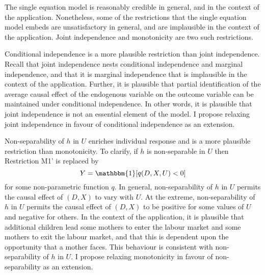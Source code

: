 \documentclass[12pt,a4paper,twoside]{article}
\numberwithin{equation}{section}
\begin{document}
The single equation model is reasonably credible in general, and in the context of the application. Nonetheless, some of the restrictions that the single equation model embeds are unsatisfactory in general, and are implausible in the context of the application. Joint independence and monotonicity are two such restrictions. 

Conditional independence is a more plausible restriction than joint independence. Recall that joint independence nests conditional independence and marginal independence, and that it is marginal independence that is implausible in the context of the application. Further, it is plausible that partial identification of the average causal effect of the endogenous variable on the outcome variable can be maintained under conditional independence. In other words, it is plausible that joint independence is not an essential element of the model. I propose relaxing joint independence in favour of conditional independence as an extension.

Non-separability of $h$ in $U$ enriches individual response and is a more plausible restriction than monotonicity. To clarify, if $h$ is non-separable in $U$ then Restriction M1' is replaced by  
\[Y=\mathbbm{1}[q(D,X,U)<0]\]
for some non-parametric function $q$. In general, non-separability of $h$ in $U$ permits the causal effect of $(D,X)$ to vary with $U$. At the extreme, non-separability of $h$ in $U$ permits the causal effect of $(D,X)$ to be positive for some values of $U$ and negative for others. In the context of the application, it is plausible that additional children lead some mothers to enter the labour market and some mothers to exit the labour market, and that this is dependent upon the opportunity that a mother faces. This behaviour is consistent with non-separability of $h$ in $U$. I propose relaxing monotonicity in favour of non-separability as an extension.
\end{document}
